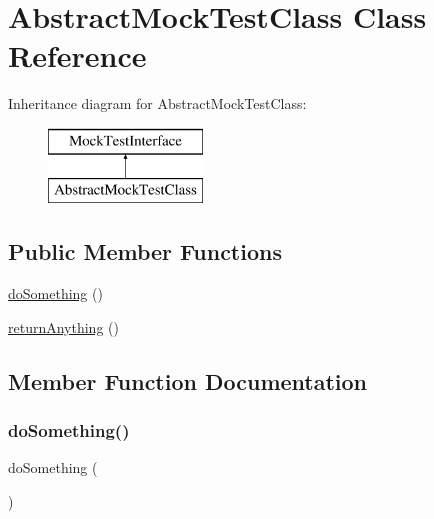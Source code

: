 \hypertarget{class_abstract_mock_test_class}{}\section{Abstract\+Mock\+Test\+Class Class Reference}
\label{class_abstract_mock_test_class}
Inheritance diagram for Abstract\+Mock\+Test\+Class\+:\begin{figure}[H]
\begin{center}
\leavevmode
\includegraphics[height=2.000000cm]{class_abstract_mock_test_class}
\end{center}
\end{figure}
\subsection*{Public Member Functions}
\begin{DoxyCompactItemize}
\item 
\mbox{\hyperlink{class_abstract_mock_test_class_abe91a8abe16159c0096d570ee6ccc985}{do\+Something}} ()
\item 
\mbox{\hyperlink{class_abstract_mock_test_class_a92fcad527108f0c33114b9b5efcf54f2}{return\+Anything}} ()
\end{DoxyCompactItemize}


\subsection{Member Function Documentation}
\mbox{\label{class_abstract_mock_test_class_abe91a8abe16159c0096d570ee6ccc985}} 
\subsubsection{\texorpdfstring{do\+Something()}{doSomething()}}
{\footnotesize\ttfamily do\+Something (\begin{DoxyParamCaption}{ }\end{DoxyParamCaption})\hspace{0.3cm}{\ttfamily [abstract]}}

